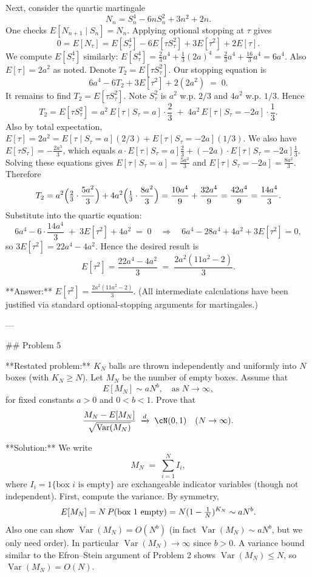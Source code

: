 \documentclass[11pt]{article}
\DeclareMathOperator{\Var}{Var}
\begin{document}
Next, consider the quartic martingale
\[
N_n = S_n^4 - 6nS_n^2 + 3n^2 + 2n.
\]
One checks $E[N_{n+1}\mid S_n] = N_n$. Applying optional stopping at $\tau$ gives
\[
0 = E[N_\tau] = E[S_\tau^4] -6E[\tau S_\tau^2] + 3E[\tau^2] + 2E[\tau].
\]
We compute $E[S_\tau^4]$ similarly: $E[S_\tau^4]=\tfrac23 a^4 + \tfrac13(2a)^4 = \tfrac23a^4 + \tfrac{16}{3}a^4 = 6a^4$. Also $E[\tau]=2a^2$ as noted. Denote $T_2=E[\tau S_\tau^2]$. Our stopping equation is
\[
6a^4 -6T_2 + 3E[\tau^2] + 2(2a^2) \;=\;0.
\]
It remains to find $T_2 = E[\tau S_\tau^2]$. Note $S_\tau^2$ is $a^2$ w.p. $2/3$ and $4a^2$ w.p. $1/3$. Hence
\[
T_2 = E[\tau S_\tau^2] = a^2\,E[\tau\mid S_\tau=a]\cdot\frac{2}{3}
\;+\;4a^2\,E[\tau\mid S_\tau=-2a]\cdot\frac{1}{3}.
\]
Also by total expectation, $E[\tau]=2a^2 = E[\tau\mid S_\tau=a](2/3) + E[\tau\mid S_\tau=-2a](1/3)$. We also have $E[\tau S_\tau] = -\tfrac{2a^3}{3}$, which equals $a\cdot E[\tau\mid S_\tau=a]\tfrac{2}{3} + (-2a)\cdot E[\tau\mid S_\tau=-2a]\tfrac{1}{3}$. Solving these equations gives $E[\tau\mid S_\tau=a]=\frac{5a^2}{3}$ and $E[\tau\mid S_\tau=-2a]=\frac{8a^2}{3}$. Therefore
\[
T_2 = a^2\Bigl(\tfrac{2}{3}\cdot\frac{5a^2}{3}\Bigr) + 4a^2\Bigl(\tfrac{1}{3}\cdot\frac{8a^2}{3}\Bigr)
= \frac{10a^4}{9} + \frac{32a^4}{9}
= \frac{42a^4}{9} = \frac{14a^4}{3}.
\]
Substitute into the quartic equation:
\[
6a^4 - 6\cdot\frac{14a^4}{3} \;+\;3E[\tau^2] + 4a^2 \;=\; 0
\quad\Longrightarrow\quad
6a^4 - 28a^4 + 4a^2 + 3E[\tau^2] =0,
\]
so $3E[\tau^2] = 22a^4 - 4a^2$. Hence the desired result is
\[
E[\tau^2] = \frac{22a^4 - 4a^2}{3} \;=\; \frac{2a^2(11a^2-2)}{3}.
\]

**Answer:** $\displaystyle E[\tau^2] = \frac{2a^2(11a^2-2)}{3}$. (All intermediate calculations have been justified via standard optional-stopping arguments for martingales.)

---

\#\# Problem 5

**Restated problem:** $K_N$ balls are thrown independently and uniformly into $N$ boxes (with $K_N\ge N$). Let $M_N$ be the number of empty boxes. Assume that
\[
E[M_N] \sim a N^b, \quad \text{as }N\to\infty,
\]
for fixed constants $a>0$ and $0<b<1$. Prove that
\[
\frac{M_N - E[M_N]}{\sqrt{\Var(M_N)}} \;\xrightarrow{d}\; \cN(0,1)
\quad (N\to\infty).
\]

**Solution:** We write
\[
M_N \;=\; \sum_{i=1}^N I_i,
\]
where $I_i = 1\{\text{box $i$ is empty}\}$ are exchangeable indicator variables (though not independent). First, compute the variance. By symmetry,
\[
E[M_N] = N\,P(\hbox{box $1$ empty}) = N(1-\tfrac1N)^{K_N}\sim aN^b.
\]
Also one can show $\Var(M_N)=O(N^b)$ (in fact $\Var(M_N)\sim aN^b$, but we only need order). In particular $\Var(M_N)\to\infty$ since $b>0$. A variance bound similar to the Efron–Stein argument of Problem 2 shows $\Var(M_N)\le N$, so $\Var(M_N)=O(N)$.
\end{document}
